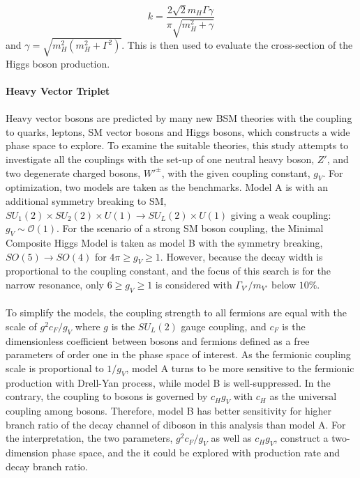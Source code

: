 \begin{equation}
k=\frac{2\sqrt{2}m_{H}\Gamma\gamma}{\pi\sqrt{m_{H}^2+\gamma}}
\end{equation}
and $\gamma=\sqrt{m_{H}^2(m_{H}^2+\Gamma^2)}$. This is then used to evaluate the cross-section of the Higgs boson production.
\\
\\{\bf Heavy Vector Triplet}
\\
\\Heavy vector bosons are predicted by many new BSM theories with the coupling to quarks, leptons, SM vector bosons and Higgs bosons, which constructs a wide phase space to explore. To examine the suitable theories, this study attempts to investigate all the couplings with the set-up of one neutral heavy boson, $Z'$, and two degenerate charged bosons, $W'^{\pm}$, with the given coupling constant, $g_{V}$. For optimization,  two models are taken as the benchmarks. Model A is with an additional symmetry breaking to SM, $SU_{1}(2)\times SU_{2}(2) \times U(1) \rightarrow SU_{L}(2) \times U(1)$ giving a weak coupling: $g_{V} \sim \mathcal{O}(1)$. For the scenario of a strong SM boson coupling, the Minimal Composite Higgs Model is taken as model B with the symmetry breaking, $SO(5) \rightarrow SO(4)$ for $4\pi \geq g_{V} \geq 1$. However, because the decay width is proportional to the coupling constant, and the focus of this search is for the narrow resonance, only $6 \geq g_{V} \geq 1$ is considered with $\Gamma_{V'}/m_{V'}$ below $10\%$.
\\
\\To simplify the models, the coupling strength to all fermions are equal with the scale of $g^2c_{F}/g_{V}$ where $g$ is the $SU_{L}(2)$ gauge coupling, and $c_{F}$ is the dimensionless coefficient between bosons and fermions defined as a free parameters of order one in the phase space of interest. As the fermionic coupling scale is proportional to $1/g_{V}$, model A turns to be more sensitive to the fermionic production with Drell-Yan process, while model B is well-suppressed. In the contrary, the coupling to bosons is governed by $c_{H}g_{V}$ with $c_{H}$ as the universal coupling among bosons. Therefore, model B has better sensitivity for higher branch ratio of the decay channel of diboson in this analysis than model A. For the interpretation, the two parameters, $g^2c_{F}/g_{V}$ as well as $c_{H}g_{V}$, construct a two-dimension phase space, and the it could be explored with production rate and decay branch ratio. 
\\
